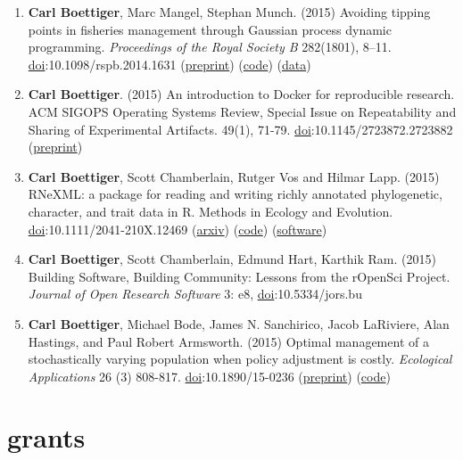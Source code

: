 \documentclass[11pt,a4paper,sans]{moderncv}        %
\begin{document}
\begin{enumerate}
\item
  \textbf{Carl Boettiger}, Marc Mangel, Stephan Munch. (2015) Avoiding
  tipping points in fisheries management through Gaussian process
  dynamic programming. \emph{Proceedings of the Royal Society B}
  282(1801), 8--11.
  \href{http://dx.doi.org/10.1098/rspb.2014.1631}{doi}:10.1098/rspb.2014.1631
  (\href{http://arxiv.org/abs/1412.8081}{preprint})
  (\href{https://github.com/cboettig/nonparametric-bayes}{code})
  (\href{http://dx.doi.org/10.5061/dryad.mj226}{data})
\item
  \textbf{Carl Boettiger}. (2015) An introduction to Docker for
  reproducible research. ACM SIGOPS Operating Systems Review, Special
  Issue on Repeatability and Sharing of Experimental Artifacts. 49(1),
  71-79.
  \href{http://dx.doi.org/10.1145/2723872.2723882}{doi}:10.1145/2723872.2723882
  (\href{http://arxiv.org/abs/1410.0846}{preprint})
\item
  \textbf{Carl Boettiger}, Scott Chamberlain, Rutger Vos and Hilmar
  Lapp. (2015) RNeXML: a package for reading and writing richly
  annotated phylogenetic, character, and trait data in R. Methods in
  Ecology and Evolution.
  \href{http://dx.doi.org/10.1111/2041-210X.12469}{doi}:10.1111/2041-210X.12469
  (\href{http://arxiv.org/abs/1506.02722}{arxiv})
  (\href{https://github.com/ropensci/RNeXML}{code})
  (\href{http://cran.rstudio.com/web/packages/RNeXML}{software})
\item
  \textbf{Carl Boettiger}, Scott Chamberlain, Edmund Hart, Karthik Ram.
  (2015) Building Software, Building Community: Lessons from the
  rOpenSci Project. \emph{Journal of Open Research Software} 3: e8,
  \href{http://dx.doi.org/10.5334/jors.bu}{doi}:10.5334/jors.bu
\item
  \textbf{Carl Boettiger}, Michael Bode, James N. Sanchirico, Jacob
  LaRiviere, Alan Hastings, and Paul Robert Armsworth. (2015) Optimal
  management of a stochastically varying population when policy
  adjustment is costly. \emph{Ecological Applications} 26 (3) 808-817.
  \href{http://dx.doi.org/10.1890/15-0236}{doi}:10.1890/15-0236
  (\href{http://arxiv.org/pdf/1507.07037v1.pdf}{preprint})
  (\href{https://github.com/cboettig/pdg_control}{code})
\end{enumerate}

\section{grants}\label{grants}
\end{document}
